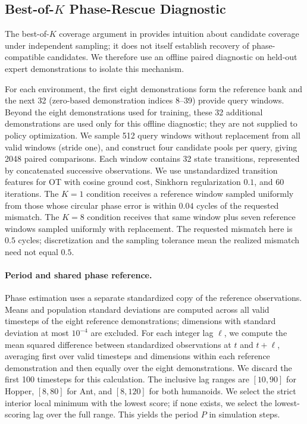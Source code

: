 \subsection{Best-of-\texorpdfstring{$K$}{K} Phase-Rescue Diagnostic}
\label{sec:phase_rescue}

The best-of-$K$ coverage argument in  provides intuition
about candidate coverage under independent sampling; it does not itself
establish recovery of phase-compatible candidates. We therefore use an
offline paired diagnostic on held-out expert demonstrations to isolate
this mechanism.

For each environment, the first eight demonstrations form the reference
bank and the next 32 (zero-based demonstration indices 8--39) provide
query windows. Beyond the eight demonstrations used for training, these
32 additional demonstrations are used only for this offline diagnostic;
they are not supplied to policy optimization. We sample 512 query windows
without replacement from all valid windows (stride one), and construct
four candidate pools per query, giving 2048 paired comparisons. Each
window contains 32 state transitions, represented by concatenated
successive observations. We use unstandardized transition features for
OT with cosine ground cost, Sinkhorn regularization $0.1$, and 60
iterations. The $K=1$ condition receives a reference window sampled
uniformly from those whose circular phase error is within $0.04$ cycles
of the requested mismatch. The $K=8$ condition receives that same window
plus seven reference windows sampled uniformly with replacement.
The requested mismatch here is $0.5$ cycles; discretization and the
sampling tolerance mean the realized mismatch need not equal $0.5$.

\paragraph{Period and shared phase reference.}
Phase estimation uses a separate standardized copy of the reference
observations. Means and population standard deviations are computed
across all valid timesteps of the eight reference demonstrations;
dimensions with standard deviation at most $10^{-4}$ are excluded.
For each integer lag $\ell$, we compute the mean squared difference
between standardized observations at $t$ and $t+\ell$, averaging first
over valid timesteps and dimensions within each reference demonstration
and then equally over the eight demonstrations. We discard the first
100 timesteps for this calculation. The inclusive lag ranges are
$[10,90]$ for Hopper, $[8,80]$ for Ant, and $[8,120]$ for both humanoids.
We select the strict interior local minimum with the lowest score;
if none exists, we select the lowest-scoring lag over the full range.
This yields the period $P$ in simulation steps.

